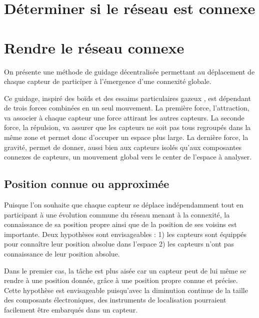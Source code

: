 \documentclass[10pt]{article}
\begin{document}
\begin{multicols}{2}
\begin{figure}[H]
  

  \caption{}
  \label{}

\end{figure}

\section{Déterminer si le réseau est connexe}

\section{Rendre le réseau connexe}

On présente une méthode de guidage décentralisée permettant au
déplacement de chaque capteur de participer à l'émergence d'une
connexité globale.

Ce guidage, inspiré des boïds \cite{Reynolds1987} et des essaims
particulaires gazeux \cite{Cheng2011497}, est dépendant de trois
forces combinées en un seul mouvement. La première force,
l'attraction, va associer à chaque capteur une force attirant les
autres capteurs. La seconde force, la répulsion, va assurer que les
capteurs ne soit pas tous regroupés dans la même zone et permet donc
d'occuper un espace plus large. La dernière force, la gravité, permet
de donner, aussi bien aux capteurs isolés qu'aux composantes connexes
de capteurs, un mouvement global vers le center de l'espace à
analyser.

\subsection{Position connue ou approximée}

Puisque l'on souhaite que chaque capteur se déplace indépendamment
tout en participant à une évolution commune du réseau menant à la
connexité, la connaissance de sa position propre ainsi que de la
position de ses voisins est importante. Deux hypothèses sont
envisageables : 1) les capteurs sont équippés pour connaître leur
position absolue dans l'espace 2) les capteurs n'ont pas connaissance
de leur position absolue.

Dans le premier cas, la tâche est plus aisée car un capteur peut de
lui même se rendre à une position donnée, grâce à une position propre
connue et précise. Cette hypothèse est envisageable puisqu'avec la
diminution continue de la taille des composants électroniques, des
instruments de localisation pourraient facilement être embarqués dans
un capteur.


\end{multicols}
\end{document}
